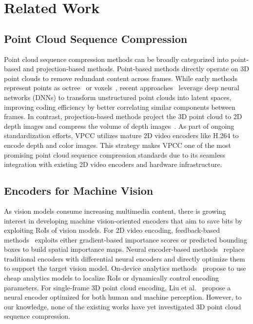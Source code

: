 \section{Related Work}
\subsection{Point Cloud Sequence Compression}
Point cloud sequence compression methods can be broadly categorized into point-based and projection-based methods.
Point-based methods directly operate on 3D point clouds to remove redundant content across frames. While early methods represent points as octree~\cite{garcia2019geometry} or voxels~\cite{de2017motion}, recent approaches~\cite{gomes2021graph, akhtar2024inter} leverage deep neural networks (DNNs) to transform unstructured point clouds into latent spaces, improving coding efficiency by better correlating similar components between frames. In contrast, projection-based methods project the 3D point cloud to 2D depth images and compress the volume of depth images~\cite{graziosiOverviewOngoingPoint2020, sun2020advanced}. As part of ongoing standardization efforts, VPCC \cite{graziosiOverviewOngoingPoint2020} utilizes mature 2D video encoders like H.264 to encode depth and color images. This strategy makes VPCC one of the most promising point cloud sequence compression standards due to its seamless integration with existing 2D video encoders and hardware infrastructure.

\subsection{Encoders for Machine Vision}
As vision models consume increasing multimedia content, there is growing interest in developing machine vision-oriented encoders that aim to save bits by exploiting RoIs of vision models. For 2D video encoding, feedback-based methods~\cite{xie2019source, du2020server, li2021task, xiao2022dnn, liu2022adamask} exploits either gradient-based importance scores or predicted bounding boxes to build spatial importance maps. Neural encoder-based methods~\cite{reich2024deep, wang2022enabling} replace traditional encoders with differential neural encoders and directly optimize them to support the target vision model. On-device analytics methods~\cite{du2022accmpeg, murad2022dao, zhang2022casva} propose to use cheap analytics models to localize RoIs or dynamically control encoding parameters. For single-frame 3D point cloud encoding, Liu et al.~\cite{liu2023pchm} propose a neural encoder optimized for both human and machine perception. However, to our knowledge, none of the existing works have yet investigated 3D point cloud sequence compression. 